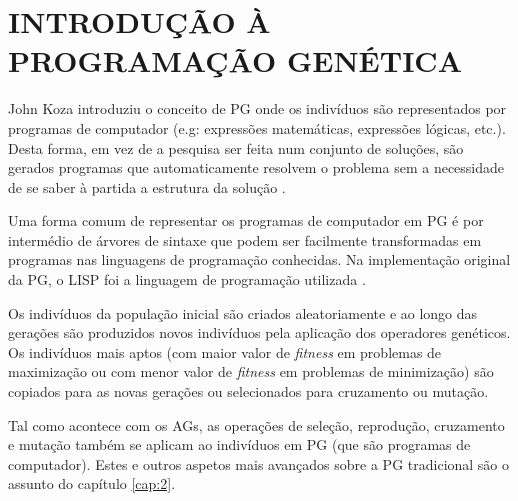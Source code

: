 \section{INTRODUÇÃO À PROGRAMAÇÃO GENÉTICA}
\label{sec:introgp}

John Koza introduziu o conceito de \ac{PG} onde os indivíduos são representados por programas de computador 
(e.g: expressões matemáticas, expressões lógicas, etc.). Desta forma, em vez de a pesquisa ser feita num conjunto de soluções, 
são gerados programas que automaticamente resolvem o problema sem a necessidade de se saber à partida a estrutura da solução 
\citep{Koza1992}.

Uma forma comum de representar os programas de computador em \ac{PG} é por intermédio de árvores de sintaxe que 
podem ser facilmente transformadas em programas nas linguagens de programação conhecidas. Na implementação
original da \ac{PG}, o \ac{LISP} foi a linguagem de programação utilizada \citep{Koza1992}.

Os indivíduos da população inicial são criados aleatoriamente e ao longo das gerações são produzidos novos indivíduos pela 
aplicação dos operadores genéticos. Os indivíduos mais aptos (com maior valor de \emph{fitness} em problemas de maximização 
ou com menor valor de \emph{fitness} em problemas de minimização) são copiados para as novas gerações ou selecionados para 
cruzamento ou mutação. 

Tal como acontece com os \acp{AG}, as operações de seleção, reprodução, cruzamento e mutação também se aplicam 
ao indivíduos em \ac{PG} (que são programas de computador). Estes e outros aspetos mais avançados sobre a 
\ac{PG} tradicional são o assunto do capítulo \ref{cap:2}.